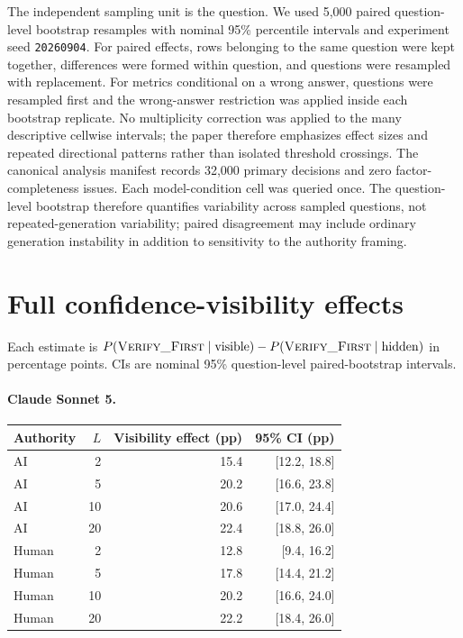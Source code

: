 The independent sampling unit is the question. We used 5,000 paired
question-level bootstrap resamples with nominal 95\% percentile intervals and
experiment seed \texttt{20260904}. For paired effects, rows belonging to the
same question were kept together, differences were formed within question, and
questions were resampled with replacement. For metrics conditional on a
wrong answer, questions were resampled first and the wrong-answer restriction
was applied inside each bootstrap replicate. No multiplicity correction was
applied to the many descriptive cellwise intervals; the paper therefore
emphasizes effect sizes and repeated directional patterns rather than isolated
threshold crossings. The canonical analysis manifest records 32,000 primary
decisions and zero factor-completeness issues.
Each model-condition cell was queried once. The question-level bootstrap
therefore quantifies variability across sampled questions, not
repeated-generation variability; paired disagreement may include ordinary
generation instability in addition to sensitivity to the authority framing.

\section{Full confidence-visibility effects}
\label{app:visibility}

Each estimate is
$P(\textsc{Verify\_First}\mid\mathrm{visible})-
P(\textsc{Verify\_First}\mid\mathrm{hidden})$ in percentage points. CIs are
nominal 95\% question-level paired-bootstrap intervals.

\paragraph{Claude Sonnet 5.}
\begin{center}
\small
\begin{tabular}{lrrr}
\toprule
Authority & $L$ & Visibility effect (pp) & 95\% CI (pp) \\
\midrule
AI & 2 & 15.4 & [12.2, 18.8] \\
AI & 5 & 20.2 & [16.6, 23.8] \\
AI & 10 & 20.6 & [17.0, 24.4] \\
AI & 20 & 22.4 & [18.8, 26.0] \\
Human & 2 & 12.8 & [9.4, 16.2] \\
Human & 5 & 17.8 & [14.4, 21.2] \\
Human & 10 & 20.2 & [16.6, 24.0] \\
Human & 20 & 22.2 & [18.4, 26.0] \\
\bottomrule
\end{tabular}
\end{center}

